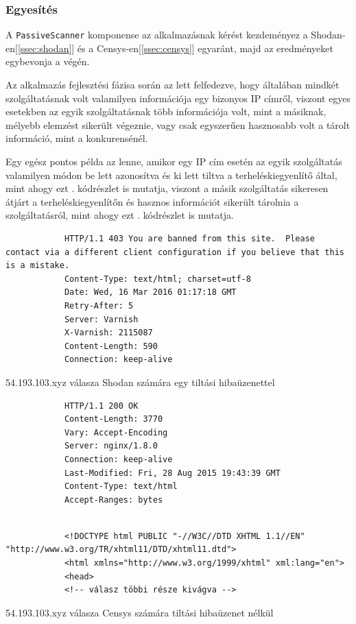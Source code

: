 \documentclass[a4paper,12pt]{article}
\begin{document}
\subsubsection{Egyesítés}

	A \texttt{PassiveScanner} komponense az alkalmazásnak kérést kezdeményez a Shodan-en[\ref{ssec:shodan}] és a  Censys-en[\ref{ssec:censys}] egyaránt, majd az eredményeket egybevonja a végén.
	
	Az alkalmazás fejlesztési fázisa során az lett felfedezve, hogy általában mindkét szolgáltatásnak volt valamilyen információja egy bizonyos IP címről, viszont egyes esetekben az egyik szolgáltatásnak több információja volt, mint a másiknak, mélyebb elemzést sikerült végeznie, vagy csak egyszerűen hasznosabb volt a tárolt információ, mint a konkurensénél.
	
	Egy egész pontos példa az lenne, amikor egy IP cím esetén az egyik szolgáltatás valamilyen módon be lett azonosítva és ki lett tiltva a terheléskiegyenlítő által, mint ahogy ezt \az{\ref{shodanban}}. kódrészlet is mutatja, viszont a másik szolgáltatás sikeresen átjárt a terheléskiegyenlítőn és hasznos információt sikerült tárolnia a szolgáltatásról, mint ahogy ezt \az{\ref{censysnoban}}. kódrészlet is mutatja.
	
	\begin{listing}[H]
		\begin{verbatim}
			HTTP/1.1 403 You are banned from this site.  Please contact via a different client configuration if you believe that this is a mistake.
			Content-Type: text/html; charset=utf-8
			Date: Wed, 16 Mar 2016 01:17:18 GMT
			Retry-After: 5
			Server: Varnish
			X-Varnish: 2115087
			Content-Length: 590
			Connection: keep-alive
		\end{verbatim}
		\caption{54.193.103.xyz válasza Shodan számára egy tiltási hibaüzenettel}
		\label{shodanban}
	\end{listing}
		
	\begin{listing}[H]
		\begin{verbatim}
			HTTP/1.1 200 OK
			Content-Length: 3770
			Vary: Accept-Encoding
			Server: nginx/1.8.0
			Connection: keep-alive
			Last-Modified: Fri, 28 Aug 2015 19:43:39 GMT
			Content-Type: text/html
			Accept-Ranges: bytes
		\end{verbatim}
		\vspace{-5pt}
		\begin{verbatim}
			 
			<!DOCTYPE html PUBLIC "-//W3C//DTD XHTML 1.1//EN" "http://www.w3.org/TR/xhtml11/DTD/xhtml11.dtd">
			<html xmlns="http://www.w3.org/1999/xhtml" xml:lang="en">
			<head>
			<!-- válasz többi része kivágva -->
		\end{verbatim}
		\caption{54.193.103.xyz válasza Censys számára tiltási hibaüzenet nélkül}
		\label{censysnoban}
	\end{listing}
	
\end{document}
